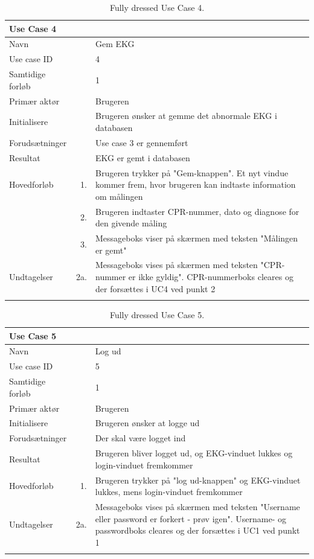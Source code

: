\begin{longtabu} to  %
    {\large \textbf{Use Case 4}} && \\
    \toprule
    Navn &&    Gem EKG\\
    Use case ID &&    4\\
    Samtidige forløb &&    1\\
    Primær aktør &&    Brugeren\\
    Initialisere &&    Brugeren ønsker at gemme det abnormale EKG i databasen\\
    Forudsætninger &&  Use case 3 er gennemført\\
    Resultat &&    EKG er gemt i databasen                    \\ \midrule
    Hovedforløb &    1. &    Brugeren trykker på "Gem-knappen". Et nyt vindue kommer frem, hvor brugeren kan indtaste information om målingen\\[-1ex]   						 	
                &    2. &	Brugeren indtaster CPR-nummer, dato og diagnose for den givende måling\\[-1ex]                	
                &	3. &		Messageboks viser på skærmen med teksten "Målingen er gemt" \\ \midrule
                
    Undtagelser &    2a. & Messageboks vises på skærmen med teksten "CPR-nummer er ikke gyldig". CPR-nummerboks cleares og der forsættes i UC4 ved punkt 2     \\ \bottomrule
\caption{Fully dressed Use Case 4.}
\label{UC4}
\end{longtabu}

\begin{longtabu} to  %
    {\large \textbf{Use Case 5}} && \\
    \toprule
    Navn &&    Log ud\\
    Use case ID &&    5\\
    Samtidige forløb &&    1\\
    Primær aktør &&    Brugeren\\
    Initialisere &&    Brugeren ønsker at logge ud\\
    Forudsætninger &&  Der skal være logget ind\\
    Resultat &&    Brugeren bliver logget ud, og EKG-vinduet lukkes og login-vinduet fremkommer                     \\ \midrule
    Hovedforløb &    1. &    Brugeren trykker på "log ud-knappen" og EKG-vinduet lukkes, mens login-vinduet fremkommer \\ \midrule
                
    Undtagelser &    2a. & Messageboks vises på skærmen med teksten "Username eller password er forkert - prøv igen". Username- og passwordboks cleares og der forsættes i UC1 ved punkt 1     \\ \bottomrule
\caption{Fully dressed Use Case 5.}
\label{UC5}
\end{longtabu}


